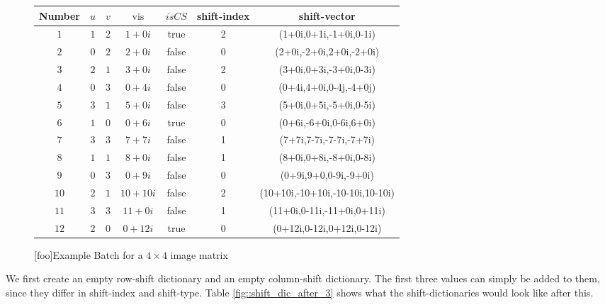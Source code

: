 \documentclass[12pt]{article}
\DeclareMathOperator{\vis}{vis}
\begin{document}
\begin{figure} [h]
	\begin{center}
		\begin{tabular}{||c c c c c c c||} 
			\hline
			Number & $u$ & $v$ & $\vis$ & $isCS$ & shift-index & shift-vector\\ [0.5ex] 
			\hline\hline
			$1$ & $1$ & $2$ & $1+0i$ & true & 2 & (1+0i,0+1i,-1+0i,0-1i)\\
			\hline
			$2$ & $0$ & $2$ & $2+0i$ & false & 0 & (2+0i,-2+0i,2+0i,-2+0i)\\
			\hline
			$3$ & $2$ & $1$ & $3+0i$ & false & 2 & (3+0i,0+3i,-3+0i,0-3i)\\
			\hline
			$4$ & $0$ & $3$ & $0+4i$ & false & 0 & (0+4i,4+0i,0-4j,-4+0j) \\
			\hline
			$5$ & $3$ & $1$ & $5+0i$ & false & 3 & (5+0i,0+5i,-5+0i,0-5i)\\
			\hline
			$6$ & $1$ & $0$ & $0+6i$ & true & 0 & (0+6i,-6+0i,0-6i,6+0i) \\
			\hline
			$7$ & $3$ & $3$ & $7+7i$ & false & 1 & (7+7i,7-7i,-7-7i,-7+7i)\\
			\hline
			$8$ & $1$ & $1$ & $8+0i$ & false & 1 & (8+0i,0+8i,-8+0i,0-8i)\\
			\hline
			$9$ & $0$ & $3$ & $0+9i$ & false & 0 & (0+9i,9+0,0-9i,-9+0i)\\
			\hline
			$10$ & $2$ & $1$ & $10+10i$ & false & 2 & (10+10i,-10+10i,-10-10i,10-10i)\\
			\hline
			$11$ & $3$ & $3$ & $11+0i$ & false & 1 & (11+0i,0-11i,-11+0i,0+11i) \\
			\hline
			$12$ & $2$ & $0$ & $0+12i$ & true & 0 & (0+12i,0-12i,0+12i,0-12i)\\
			\hline
		\end{tabular}
	\end{center}
[foo]{Example Batch for a $4\times 4$ image matrix}
\label{fig::exampleBatch}
\end{figure}

We first create an empty row-shift dictionary and an empty column-shift dictionary. The first three values can simply be added to them, since they differ in shift-index and shift-type. Table \ref{fig::shift_dic_after_3} shows what the shift-dictionaries would look like after this.
\end{document}
